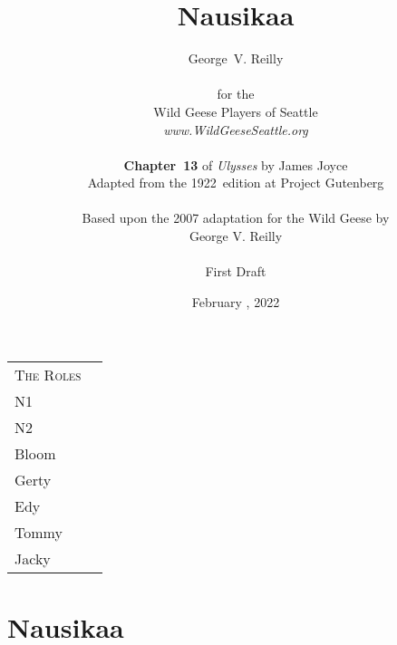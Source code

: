 


\title{\Huge Nausikaa}
\author{George~V. Reilly\\
\\
{\small for the}\\
Wild Geese Players of Seattle\\
{\textit{www.WildGeeseSeattle.org}}\\
\\
{\small \textbf{Chapter~13} of \textit{Ulysses} by James Joyce}\\
{\small Adapted from the 1922~edition at Project Gutenberg}
\\
\\
{\small Based upon the 2007 adaptation for the Wild Geese by}\\
{\small George V. Reilly}\\
\\
{\small First Draft}}
\date{February , 2022}
\raggedbottom



\maketitle
\thispagestyle{empty}
\pagebreak

\begin{tabular}{lp{10cm}}
    \multicolumn{1}{c}{\Large \textsc{The Roles}} \\
N1\\
N2\\
Bloom \\
Gerty \\
Edy \\
Tommy \\
Jacky \\
\end{tabular}

\thispagestyle{empty}
\newpage


\setcounter{page}{1}

\section*{Nausikaa}




